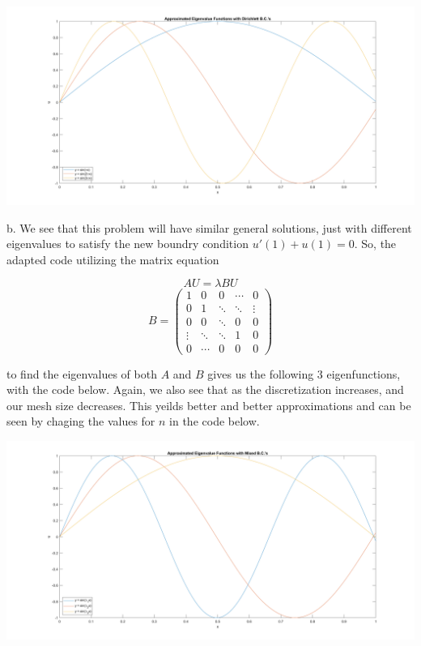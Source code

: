 \begin{solution}
    \begin{center}
        \includegraphics[scale=0.15]{1a.PNG}
    \end{center}

    b. We see that this problem will have similar general solutions, just with different eigenvalues to
    satisfy the new boundry condition $u'(1)+u(1)=0$. So, the adapted code utilizing the matrix equation

    $$AU=\lambda BU$$
    $$B=\left(\begin{array}{ccccc} 1 & 0 & 0 & \cdots & 0 \\ 0 & 1 & \ddots & \ddots & \vdots
                                \\ 0 & 0 & \ddots & 0 & 0\\ \vdots & \ddots & \ddots & 1 & 0
                                \\ 0 & \cdots & 0 & 0 & 0
        \end{array}\right)$$
    
    to find the eigenvalues of both $A$ and $B$ gives us the following 3 eigenfunctions, with the code
    below. Again, we also see that as the discretization increases, and our mesh size decreases. This
    yeilds better and better approximations and can be seen by chaging the values for $n$ in the code
    below.
    
    \begin{center}
        \includegraphics[scale=0.15]{1b.PNG}
    \end{center}


\end{solution}
